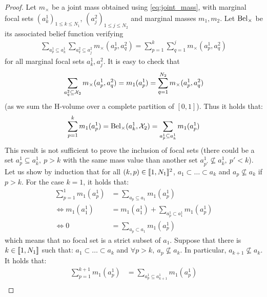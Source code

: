 \begin{proof}
    Let $m_\times$ be a joint mass obtained using \eqref{eq:joint_mass}, with marginal focal sets $(a^1_k)_{1\leqslant k\leqslant N_1}$, $(a^2_j)_{1\leqslant j\leqslant N_2}$ and marginal masses $m_1,m_2$. 
    Let $\mathrm{Bel}_\times$ be its associated belief function verifying
    \begin{align*}
        \sum_{a^1_p\subseteq a^1_k}\sum_{a^2_q\subseteq a_j^2}m_\times(a^1_p, a^2_q) = \sum_{p=1}^k\sum_{q=1}^j m_\times(a^1_p, a^2_q)
    \end{align*}
    for all marginal focal sets $a^1_k,a^2_j$. It is easy to check that
    \begin{align*}
        \sum_{a^2_q\subseteq \mathcal{X}_2}m_\times(a^1_p, a^2_q)=m_1(a^1_p)=\sum_{q=1}^{N_2}m_\times(a^1_p, a^2_q)    
    \end{align*}
    (as we sum the H-volume over a complete partition of $[0,1]$). Thus it holds that:
    \begin{align*}
        \sum_{p=1}^k m_1(a^1_p) = \mathrm{Bel}_\times(a^1_k,\mathcal{X}_2)=\sum_{a^1_p\subseteq a_k^1}m_1(a^1_p)
    \end{align*}
    This result is not sufficient to prove the inclusion of focal sets (there could be a set $a^1_p\subseteq a^1_k,~p>k$ with the same mass value than another set $a^1_{p'}\not\subseteq a^1_k,~p' < k$). Let us show by induction that for all $(k, p)\in[\![1,N_1]\!]^2$, $a_1\subset\dots\subset a_k$ and $a_p\not\subseteq a_k$ if $p>k$.
    For the case $k=1$, it holds that:
    \begin{align*}
        \sum_{p=1}^1m_1(a^1_p) &= \sum_{a_p\subseteq a_1}m_1(a^1_p)\\
        \Leftrightarrow m_1(a^1_1) &= m_1(a^1_1) + \sum_{a^1_p\subset a^1_1}m_1(a^1_p)\\
        \Leftrightarrow 0 &=\sum_{a_p\subset a_1}m_1(a^1_p)
    \end{align*}
    which means that no focal set is a strict subset of $a_1$.
    Suppose that there is $k\in[\![1,N_1]\!]$ such that: $a_1\subset\dots\subset a_k$ and $\forall p>k,~a_p\not\subseteq a_k$. In particular, $a_{k+1}\not\subseteq a_k$. It holds that:
    \begin{align*}
        \sum_{p=1}^{k+1}m_1(a^1_p) &= \sum_{a^1_p\subseteq a^1_{k+1}}m_1(a^1_p)\\

\end{align*}
\end{proof}
